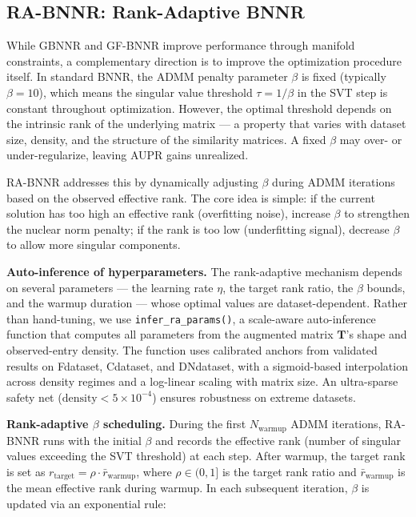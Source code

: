 \documentclass[unnumsec,webpdf,contemporary,large]{oup-authoring-template}
\begin{document}
\subsection{RA-BNNR: Rank-Adaptive BNNR}
\label{sec:rabnnr}

While GBNNR and GF-BNNR improve performance through manifold constraints, a complementary direction is to improve the optimization procedure itself. In standard BNNR, the ADMM penalty parameter $\beta$ is fixed (typically $\beta = 10$), which means the singular value threshold $\tau = 1/\beta$ in the SVT step is constant throughout optimization. However, the optimal threshold depends on the intrinsic rank of the underlying matrix --- a property that varies with dataset size, density, and the structure of the similarity matrices. A fixed $\beta$ may over- or under-regularize, leaving AUPR gains unrealized.

RA-BNNR addresses this by dynamically adjusting $\beta$ during ADMM iterations based on the observed effective rank. The core idea is simple: if the current solution has too high an effective rank (overfitting noise), increase $\beta$ to strengthen the nuclear norm penalty; if the rank is too low (underfitting signal), decrease $\beta$ to allow more singular components.

\textbf{Auto-inference of hyperparameters.} The rank-adaptive mechanism depends on several parameters --- the learning rate $\eta$, the target rank ratio, the $\beta$ bounds, and the warmup duration --- whose optimal values are dataset-dependent. Rather than hand-tuning, we use \texttt{infer\_ra\_params()}, a scale-aware auto-inference function that computes all parameters from the augmented matrix $\mathbf{T}$'s shape and observed-entry density. The function uses calibrated anchors from validated results on Fdataset, Cdataset, and DNdataset, with a sigmoid-based interpolation across density regimes and a log-linear scaling with matrix size. An ultra-sparse safety net ($\text{density} < 5 \times 10^{-4}$) ensures robustness on extreme datasets.

\textbf{Rank-adaptive $\beta$ scheduling.} During the first $N_{\text{warmup}}$ ADMM iterations, RA-BNNR runs with the initial $\beta$ and records the effective rank (number of singular values exceeding the SVT threshold) at each step. After warmup, the target rank is set as $r_{\text{target}} = \rho \cdot \bar{r}_{\text{warmup}}$, where $\rho \in (0, 1]$ is the target rank ratio and $\bar{r}_{\text{warmup}}$ is the mean effective rank during warmup. In each subsequent iteration, $\beta$ is updated via an exponential rule:
\end{document}
